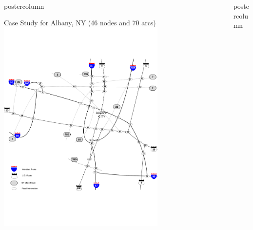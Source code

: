 \documentclass[final]{beamer}
\newlength{\columnheight}
\begin{document}
\begin{frame}
\begin{columns}
\begin{column}{0.32\textwidth}
\begin{beamercolorbox}[center,wd=\textwidth]{postercolumn}
\begin{minipage}[T]{.95\textwidth}
{  \begin{block}{Case Study for Albany, NY (46 nodes and 70 arcs)}
    \includegraphics[width=0.7\textwidth]{map_albany}
  \end{block}


}
\end{minipage}
\end{beamercolorbox}
\end{column}
\begin{column}{0.32\textwidth}
\begin{beamercolorbox}[center,wd=\textwidth]{postercolumn}
\begin{minipage}[T]{.95\textwidth}
\parbox[t][\columnheight]{\textwidth}{





}
\end{minipage}
\end{beamercolorbox}
\end{column}
\end{columns}
\end{frame}
\end{document}
